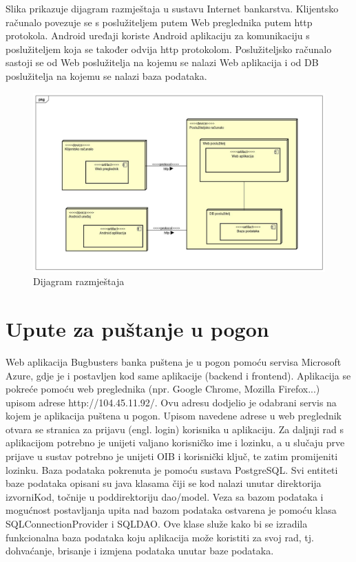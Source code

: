 			Slika prikazuje dijagram razmještaja u sustavu Internet bankarstva. Klijentsko računalo povezuje se s poslužiteljem putem Web preglednika putem http protokola. Android uređaji koriste Android aplikaciju za komunikaciju s poslužiteljem koja se također odvija http protokolom. Poslužiteljsko računalo sastoji se od Web poslužitelja na kojemu se nalazi Web aplikacija i od DB poslužitelja na kojemu se nalazi baza podataka.

			\begin{figure}[H]
				\includegraphics[scale=0.3]{Slike/dijagram_razmjestaja.jpg}
				\centering
				\caption{Dijagram razmještaja}
				\label{fig:dijagram}
			\end{figure}
		
		\newpage
		\section{Upute za puštanje u pogon}
		Web aplikacija Bugbusters banka puštena je u pogon pomoću servisa Microsoft Azure, gdje je i postavljen kod same aplikacije (backend i frontend). Aplikacija se pokreće pomoću web preglednika (npr. Google Chrome, Mozilla Firefox...) upisom adrese http://104.45.11.92/. Ovu adresu dodjelio je odabrani servis na kojem je aplikacija puštena u pogon. Upisom navedene adrese u web preglednik otvara se stranica za prijavu (engl. login) korisnika u aplikaciju. Za daljnji rad s aplikacijom potrebno je unijeti valjano korisničko ime i lozinku, a u slučaju prve prijave u sustav potrebno je unijeti OIB i korisnički ključ, te zatim promijeniti lozinku. Baza podataka pokrenuta je pomoću sustava PostgreSQL. Svi entiteti baze podataka opisani su java klasama čiji se kod nalazi unutar direktorija izvorniKod, točnije u poddirektoriju dao/model. Veza sa bazom podataka i mogućnost postavljanja upita nad bazom podataka ostvarena je pomoću klasa SQLConnectionProvider i SQLDAO. Ove klase služe kako bi se izradila funkcionalna baza podataka koju aplikacija može koristiti za svoj rad, tj. dohvaćanje, brisanje i izmjena podataka unutar baze podataka.\\
		
